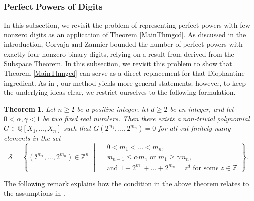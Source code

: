 \documentclass[10pt]{amsart}
\numberwithin{equation}{section}
\theoremstyle{plain}
\newtheorem{theorem}{Theorem}[section]
\theoremstyle{definition}
\begin{document}
\subsubsection{\bf Perfect Powers of Digits}\label{applyGCDdigit}

In this subsection, we revisit the problem of representing perfect powers with few nonzero digits   as an application of Theorem \ref{MainThmgcd}. 
As discussed in the introduction, Corvaja and Zannier \cite{CZ2013} bounded the number of perfect powers with exactly four nonzero binary digits, relying on a result from \cite{CZ2005} derived from the Subspace Theorem. In this subsection, we revisit this problem to show that Theorem \ref{MainThmgcd} can serve as a direct replacement for that Diophantine ingredient.  As in \cite{CZ2013}, our method yields more general statements; however, to keep the underlying ideas clear, we restrict ourselves to the following formulation.
 \begin{theorem}\label{digit}
Let $n \ge 2$ be a positive integer, let $d \ge 2$ be an integer, and let $0 < \alpha, \gamma < 1$ be two fixed real numbers. 
Then there exists a non-trivial polynomial $G \in \mathbb{Q}[X_1, \dots, X_n]$ such that
$G(2^{m_1}, \dots, 2^{m_n}) = 0$ for  all but finitely many  elements in the set 
\[
\mathcal{S} = \left\{ (2^{m_1}, \dots, 2^{m_n}) \in \mathbb{Z}^n \;\middle|\;
\begin{aligned}
& 0 < m_1 < \dots < m_n, \\
&m_{n-1} \le \alpha m_n \text{ or } m_1 \ge \gamma m_n, \\
& \text{and } 1 + 2^{m_1} + \dots + 2^{m_n} =z^d \text{ for some } z\in\mathbb{Z} 
\end{aligned}
\right\}.
\]

\end{theorem}

The following remark explains how the condition in the above theorem relates to the assumptions in \cite[Theorem~1]{CZ2005}.
\end{document}
